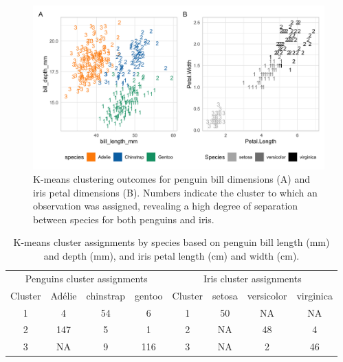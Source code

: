 \begin{Schunk}
\begin{figure}[htbp]

{\centering \includegraphics[width=6in]{fig/kmeans} 

}

\caption[K-means clustering outcomes for penguin bill dimensions (A) and iris petal dimensions (B)]{K-means clustering outcomes for penguin bill dimensions (A) and iris petal dimensions (B). Numbers indicate the cluster to which an observation was assigned, revealing a high degree of separation between species for both penguins and iris.}\label{fig:kmeans}
\end{figure}
\end{Schunk}

\begin{Schunk}
\begin{table}

\caption{\label{tab:unnamed-chunk-3}K-means cluster assignments by species based on penguin bill length (mm) and depth (mm), and iris petal length (cm) and width (cm).}
\centering
\begin{tabular}[t]{c|c|c|c|c|c|c|c}
\hline
\multicolumn{4}{c|}{Penguins cluster assignments} & \multicolumn{4}{c}{Iris cluster assignments} \\
\cline{1-4} \cline{5-8}
Cluster & Adélie & chinstrap & gentoo & Cluster & setosa & versicolor & virginica\\
\hline
1 & 4 & 54 & 6 & 1 & 50 & NA & NA\\
\hline
2 & 147 & 5 & 1 & 2 & NA & 48 & 4\\
\hline
3 & NA & 9 & 116 & 3 & NA & 2 & 46\\
\hline
\end{tabular}
\end{table}

\end{Schunk}

